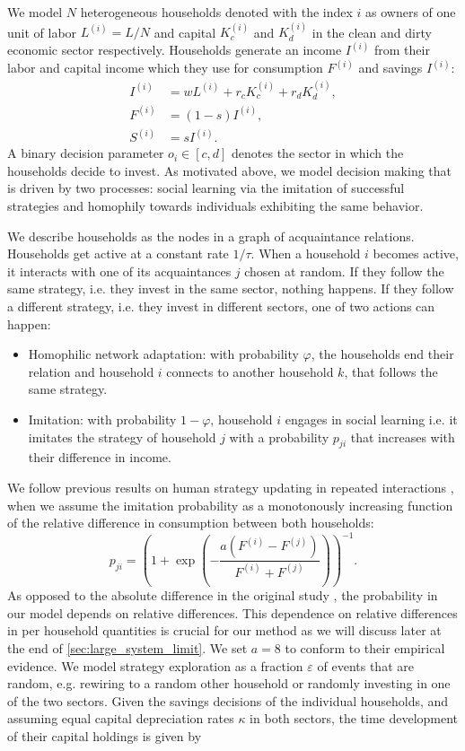 We model $N$ heterogeneous households denoted with the index $i$ as owners of one unit of labor $L^{(i)} = L/N$ and capital $K_c^{(i)}$ and $K_d^{(i)}$ in the clean and dirty economic sector respectively.
Households generate an income $I^{(i)}$ from their labor and capital income which they use for consumption $F^{(i)}$ and savings $I^{(i)}$:
\begin{align}
	I^{(i)} &= w L^{(i)} + r_c K_c^{(i)} + r_d K_d^{(i)}, \label{eq:household_income2} \\
	F^{(i)} &= (1-s) I^{(i)}, \label{eq:consumption2} \\
	S^{(i)} &= s I^{(i)}. \label{eq:savings2}
\end{align}
A binary decision parameter $o_i \in [c,d]$ denotes the sector in which the households decide to invest. As motivated above, we model decision making that is driven by two processes: social learning via the imitation of successful strategies and homophily towards individuals exhibiting the same behavior. \par

We describe households as the nodes in a graph of acquaintance relations. Households get active at a constant rate $1/\tau$. When a household $i$ becomes active, it interacts with one of its acquaintances $j$ chosen at random. If they follow the same strategy, i.e. they invest in the same sector, nothing happens. If they follow a different strategy, i.e. they invest in different sectors, one of two actions can happen:
\begin{itemize}
	\item Homophilic network adaptation: with probability $\varphi$, the households end their relation and household $i$ connects to another household $k$, that follows the same strategy. 
	\item Imitation: with probability $1-\varphi$, household $i$ engages in social learning i.e. it imitates the strategy of household $j$ with a probability $p_{ji}$ that increases with their difference in income.
\end{itemize}
We follow previous results on human strategy updating in repeated interactions \cite{Traulsen2010}, when we assume the imitation probability as a monotonously increasing function of the relative difference in consumption between both households:
\begin{equation}
	p_{ji} =  \left(1 + \exp \left(- \frac{a(F^{(i)} - F^{(j)})}{F^{(i)} + F^{(j)}} \right) \right)^{-1}.
    \label{eq:imitation_probability2}
\end{equation}
As opposed to the absolute difference in the original study \cite{Traulsen2010}, the probability in our model depends on relative differences. This dependence on relative differences in per household quantities is crucial for our method as we will discuss later at the end of \ref{sec:large_system_limit}.
We set $a = 8$ to conform to their empirical evidence.
We model strategy exploration as a fraction $\varepsilon$ of events that are random, e.g. rewiring to a random other household or randomly investing in one of the two sectors.
Given the savings decisions of the individual households, and assuming equal capital depreciation rates $\kappa$ in both sectors, the time development of their capital holdings is given by

